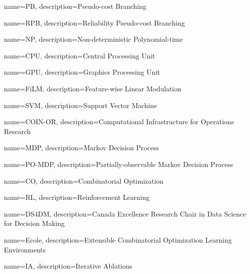 {
        name=PB,
        description={Pseudo-cost Branching}
}

{
        name=RPB,
        description={Reliability Pseudo-cost Branching}
}

{
        name=NP,
        description={Non-deterministic Polynomial-time}
}

{
        name=CPU,
        description={Central Processing Unit}
}

{
        name=GPU,
        description={Graphics Processing Unit}
}

{
        name=FiLM,
        description={Feature-wise Linear Modulation}
}

{
        name=SVM,
        description={Support Vector Machine}
}

{
        name=COIN-OR,
        description={Computational Infrastructure for Operations Research}
}

{
        name=MDP,
        description={Markov Decision Process}
}

{
        name=PO-MDP,
        description={Partially-observable Markov Decision Process}
}

{
        name=CO,
        description={Combinatorial Optimization}
}

{
        name=RL,
        description={Reinforcement Learning}
}

{
        name=DS4DM,
        description={Canada Excellence Research Chair in Data Science for Decision Making}
}

{
        name=Ecole,
        description={Extensible Combinatorial Optimization Learning Environments}
}

{
        name=IA,
        description={Iterative Ablations}
}

